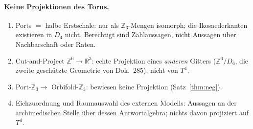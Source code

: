 \paragraph{Keine Projektionen des Torus.}
\begin{enumerate}
\item Ports $=$ halbe Erstschale: nur als $\mathbb{Z}_3$-Mengen isomorph;
      die Ikosaederkanten existieren in $D_4$ nicht. Berechtigt sind
      Zählaussagen, nicht Aussagen über Nachbarschaft oder Raten.
\item Cut-and-Project $\mathbb{Z}^6\to\mathbb{R}^3$: echte Projektion eines
      \emph{anderen} Gitters ($\mathbb{Z}^6/D_6$, die zweite geschützte
      Geometrie von Dok.~285), nicht von $T^4$.
\item Port-$\mathbb{Z}_3\to$ Orbifold-$\mathbb{Z}_3$: bewiesen keine
      Projektion (Satz~\ref{thm:neg}).
\item Eichzuordnung und Raumauswahl des externen Modells: Aussagen an der
      archimedischen Stelle über dessen Antwortalgebra; nichts davon
      projiziert auf $T^4$.
\end{enumerate}


